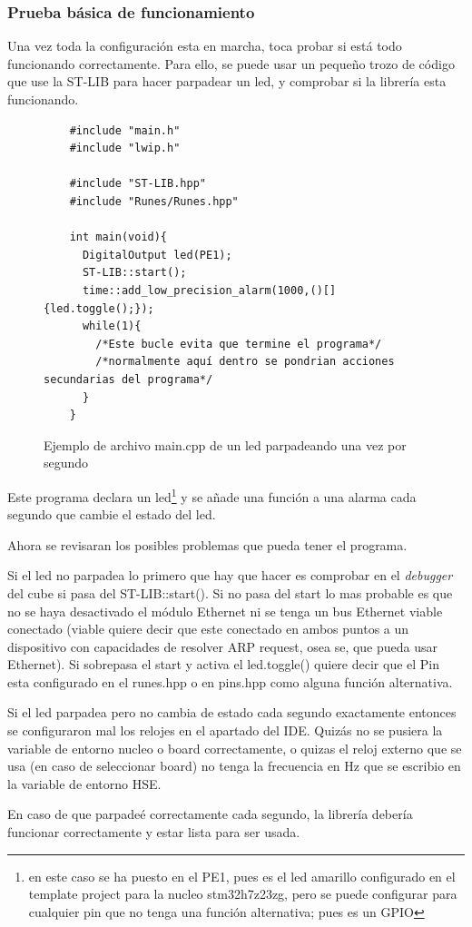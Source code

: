 \documentclass{report}
\begin{document}
\subsubsection{Prueba básica de funcionamiento}
Una vez toda la configuración esta en marcha, toca probar si está todo funcionando correctamente. Para ello, se puede usar un pequeño trozo de código que use la ST-LIB para hacer parpadear un led, y comprobar si la librería esta funcionando. \par 
\begin{figure}[h]
  \begin{lstlisting}
    #include "main.h"
    #include "lwip.h"

    #include "ST-LIB.hpp"
    #include "Runes/Runes.hpp"

    int main(void){
      DigitalOutput led(PE1);
      ST-LIB::start();
      time::add_low_precision_alarm(1000,()[]{led.toggle();});
      while(1){
        /*Este bucle evita que termine el programa*/
        /*normalmente aquí dentro se pondrian acciones secundarias del programa*/
      }
    }
  \end{lstlisting}
\caption{Ejemplo de archivo main.cpp de un led parpadeando una vez por segundo}
\label{BlinkyCode}
\end{figure}
\par \vspace{0.3cm}
Este programa declara un led\footnote{en este caso se ha puesto en el PE1, pues es el led amarillo configurado en el template project para la nucleo stm32h7z23zg, pero se puede configurar para cualquier pin que no tenga una función alternativa; pues es un GPIO} y se añade una función a una alarma cada segundo que cambie el estado del led. \par 
Ahora se revisaran los posibles problemas que pueda tener el programa. 
\par \vspace{0.3cm}
Si el led no parpadea lo primero que hay que hacer es comprobar en el \textit{debugger} del cube si pasa del ST-LIB::start(). Si no pasa del start lo mas probable es que no se haya desactivado el módulo Ethernet ni se tenga un bus Ethernet viable conectado (viable quiere decir que este conectado en ambos puntos a un dispositivo con capacidades de resolver ARP request, osea se, que pueda usar Ethernet). Si sobrepasa el start y activa el led.toggle() quiere decir que el Pin esta configurado en el runes.hpp o en pins.hpp como alguna función alternativa. 
\par \vspace{0.3cm}
Si el led parpadea pero no cambia de estado cada segundo exactamente entonces se configuraron mal los relojes en el apartado del IDE. Quizás no se pusiera la variable de entorno nucleo o board correctamente, o quizas el reloj externo que se usa (en caso de seleccionar board) no tenga la frecuencia en Hz que se escribio en la variable de entorno HSE. 
\par \vspace{0.3cm}
En caso de que parpadeé correctamente cada segundo, la librería debería funcionar correctamente y estar lista para ser usada. 
\end{document}
